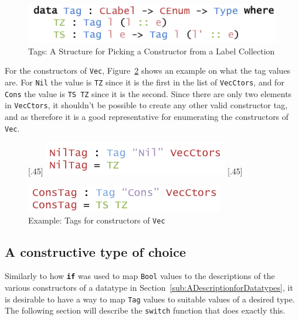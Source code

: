 \documentclass{ituthesis}
\newcommand{\ttconstructor}[1]{\textcolor{constructor-color}{\texttt{#1}}}
\newcommand{\tttype}[1]{\textcolor{type-color}{\texttt{#1}}}
\newcommand{\ttdec}[1]{\textcolor{declared-var-color}{\texttt{#1}}}
\theoremstyle{break}
\begin{document}
\begin{figure}[ht]
\begin{center}
    \includegraphics[scale=0.5]{Figures/AnInformativeEncodingofConstructorsTags.png}
\end{center}
\caption{Tags: A Structure for Picking a Constructor from a Label Collection}
\label{fig:ctortags}
\end{figure}

For the constructors of \tttype{Vec}, Figure~\ref{fig:vecctor} shows an example on what the tag values are. For \ttconstructor{Nil} the value is \ttconstructor{TZ} since it is the first in the list of \ttdec{VecCtors}, and for \ttconstructor{Cons} the value
is \ttconstructor{TS~TZ} since it is the second. Since there are only two elements in \ttdec{VecCtors}, it shouldn't be possible to create any other valid constructor tag, and as therefore it is a good representative for enumerating the constructors of \tttype{Vec}.

\begin{figure}[ht]
\begin{center}
  \subcaptionbox{Tag for \ttconstructor{Nil}\label{fig:vecctornil}}[.45\textwidth]{
    \includegraphics[scale=0.5]{Figures/VectorNilTag.png}
}
\subcaptionbox{Tag for \ttconstructor{Cons}\label{fig:vecctorcons}}[.45\textwidth]{
    \includegraphics[scale=0.5]{Figures/VectorConsTag.png}

}
\caption{Example: Tags for constructors of \tttype{Vec}}
\label{fig:vecctor}
\end{center}
\end{figure}


\subsection{A constructive type of choice}
\label{sub:AConstructiveTypeofChoice}
Similarly to how \texttt{\textbf{if}} was used to map \tttype{Bool} values to the descriptions of the various constructors of a datatype in Section~\ref{sub:ADescriptionforDatatypes}, it is desirable to have a way
to map \tttype{Tag} values to suitable values of a desired type.  The following section will describe the \ttdec{switch} function that does exactly this.
\end{document}
